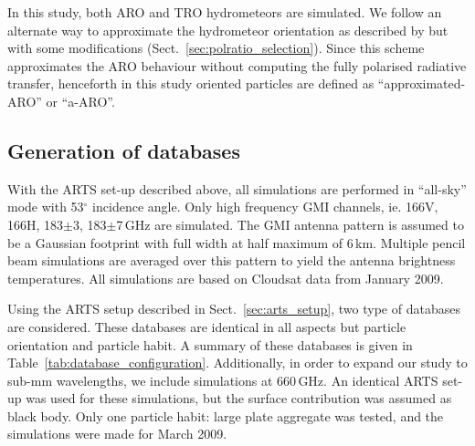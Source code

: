 \documentclass[amt, manuscript]{copernicus}
\begin{document}

In this study, both ARO and TRO hydrometeors are simulated. We follow an alternate way to approximate the hydrometeor orientation as described by \citet{barlakas:intro:21} but with some modifications (Sect.~\ref{sec:polratio_selection}). Since this scheme approximates the ARO behaviour without computing the fully polarised radiative transfer, henceforth in this study oriented particles are defined as  ``approximated-ARO'' or ``a-ARO''. 

\subsection{Generation of databases}
\label{sec:database}

With the ARTS set-up described above, all simulations are performed in ``all-sky'' mode with 53$^{\circ}$ incidence angle. Only high frequency GMI channels, ie. 166V, 166H, 183$\pm$3, 183$\pm$7\,GHz are simulated. The GMI antenna pattern is assumed to be a Gaussian footprint with full width at half maximum of 6\,km. Multiple pencil beam simulations are averaged over this pattern to yield the antenna brightness temperatures. All simulations are based on Cloudsat data from January 2009.

Using the ARTS setup described in Sect.~\ref{sec:arts_setup}, two type of databases are considered. These databases are identical in all aspects but particle orientation and particle habit. A summary of these databases is given in Table~\ref{tab:database_configuration}.  Additionally, in order to expand our study to sub-mm wavelengths, we include simulations at 660\,GHz. An identical ARTS set-up was used for these simulations, but the surface contribution was assumed as black body. Only one particle habit: large plate aggregate was tested, and the simulations were made for March 2009.
  
\end{document}
